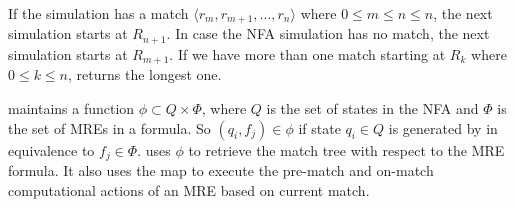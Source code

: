 If the simulation has a match $\langle r_m,r_{m+1},\dots,r_n\rangle$ where $0\le m\le n\le n$, 
the next simulation starts at $R_{n+1}$. 
In case the NFA simulation has no match, the next simulation starts at $R_{m+1}$. 
If we have more than one match starting at $R_k$ where $0\le k\le n$, 
\framework returns the longest one.

\framework maintains a function $\phi\subset Q\times\Phi$, 
where $\mathit{Q}$ is the set of states in the NFA and $\Phi$ is the set of MREs in a formula. 
So $(q_i,f_j)\in\phi$ if state $q_i\in Q$ is generated by \framework in equivalence to $f_j\in\Phi$. 
\framework uses $\phi$ to retrieve the match tree with respect to the MRE formula. 
It also uses the map to execute the pre-match and on-match computational actions of an MRE based on current match.
